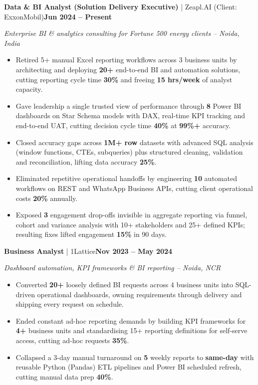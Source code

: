 \documentclass[a4paper,10pt]{article}
\newcommand{\headrow}[2]{%
  {\parfillskip=0pt\relax\rightskip=0pt\relax #1\hfill #2\par}%
}
\newcommand{\role}[4]{%
  \vspace{3pt}%
  \headrow{\textbf{#1} | #2}{\textbf{#4}}%
  \vspace{-1pt}%
  {\small\itshape\textcolor{black!62}{#3}\par}%
}
\begin{document}
\role{Data \& BI Analyst (Solution Delivery Executive)}{Zeapl.AI (Client: ExxonMobil)}{Enterprise BI \& analytics consulting for Fortune 500 energy clients -- Noida, India}{Jun 2024 -- Present}
\begin{itemize}
  \item Retired 5+ manual Excel reporting workflows across 3 business units by architecting and deploying \textbf{20+} end-to-end BI and automation solutions, cutting reporting cycle time \textbf{30\%} and freeing \textbf{15 hrs/week} of analyst capacity.
  \item Gave leadership a single trusted view of performance through \textbf{8} Power BI dashboards on Star Schema models with DAX, real-time KPI tracking and end-to-end UAT, cutting decision cycle time \textbf{40\%} at \textbf{99\%+} accuracy.
  \item Closed accuracy gaps across \textbf{1M+ row} datasets with advanced SQL analysis (window functions, CTEs, subqueries) plus structured cleaning, validation and reconciliation, lifting data accuracy \textbf{25\%}.
  \item Eliminated repetitive operational handoffs by engineering \textbf{10} automated workflows on REST and WhatsApp Business APIs, cutting client operational costs \textbf{20\%} annually.
  \item Exposed \textbf{3} engagement drop-offs invisible in aggregate reporting via funnel, cohort and variance analysis with 10+ stakeholders and 25+ defined KPIs; resulting fixes lifted engagement \textbf{15\%} in 90 days.
\end{itemize}

\role{Business Analyst}{1Lattice}{Dashboard automation, KPI frameworks \& BI reporting -- Noida, NCR}{Nov 2023 -- May 2024}
\begin{itemize}
  \item Converted \textbf{20+} loosely defined BI requests across 4 business units into SQL-driven operational dashboards, owning requirements through delivery and shipping every request on schedule.
  \item Ended constant ad-hoc reporting demands by building KPI frameworks for \textbf{4+} business units and standardising 15+ reporting definitions for self-serve access, cutting ad-hoc requests \textbf{35\%}.
  \item Collapsed a 3-day manual turnaround on \textbf{5} weekly reports to \textbf{same-day} with reusable Python (Pandas) ETL pipelines and Power BI scheduled refresh, cutting manual data prep \textbf{40\%}.
\end{itemize}
\end{document}
